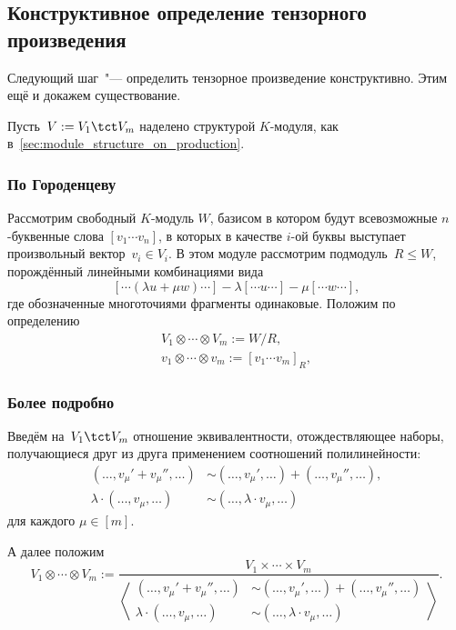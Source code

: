 
\subsection{Конструктивное определение тензорного произведения}

Следующий шаг~"--- определить тензорное произведение конструктивно. Этим ещё и докажем существование.

Пусть~$V := V_1 \tct V_m$ наделено структурой $K$-модуля, как в~\cref{sec:module_structure_on_production}.

\subsubsection{По Городенцеву}

Рассмотрим свободный $K$-модуль $W$, базисом в котором будут всевозможные $n$-буквенные слова $[v_1 \cdots v_n]$, в которых в качестве $i$-ой буквы выступает произвольный вектор~$v_i \in V_i$. В этом модуле рассмотрим подмодуль~$R \leq W$, порождённый линейными комбинациями вида
\[
	[\cdots (\lambda u + \mu w) \cdots]
	-
	\lambda [\cdots u \cdots]
	-
	\mu [\cdots w \cdots]
	,
\]
где обозначенные многоточиями фрагменты одинаковые. Положим по определению
\begin{align*}
	V_1 \otimes \cdots \otimes V_m := W / R,
	\\
	v_1 \otimes \cdots \otimes v_m := [v_1 \cdots v_m]_{R},
\end{align*}

\subsubsection{Более подробно}

Введём на~$V_1 \tct V_m$ отношение эквивалентности, отождествляющее наборы, получающиеся друг из друга применением соотношений полилинейности:
\begin{align}
	(\dots, v_\mu' + v_\mu'', \dots)
	&\sim
	(\dots, v_\mu', \dots) +
	(\dots, v_\mu'', \dots),
	\label{eq:tensor_prod:polylinearity:additivity}
	\\
	\lambda \cdot
	(\dots, v_\mu, \dots)
	&\sim
	(\dots, \lambda \cdot v_\mu, \dots)
	\label{eq:tensor_prod:polylinearity:lambda}
\end{align}
для каждого $\mu \in [m]$.

А далее положим
\[
	V_1 \otimes \cdots \otimes V_m
	:=
	\frac{
		V_1 \times \cdots \times V_m
	}{
		\left<
			\begin{aligned}
				(\dots, v_\mu' + v_\mu'', \dots)
				&\sim
				(\dots, v_\mu', \dots) +
				(\dots, v_\mu'', \dots)%
				\\
				\lambda \cdot
				(\dots, v_\mu, \dots)
				&\sim
				(\dots, \lambda \cdot v_\mu, \dots)
			\end{aligned}
		\right>
	}
	.
\]

